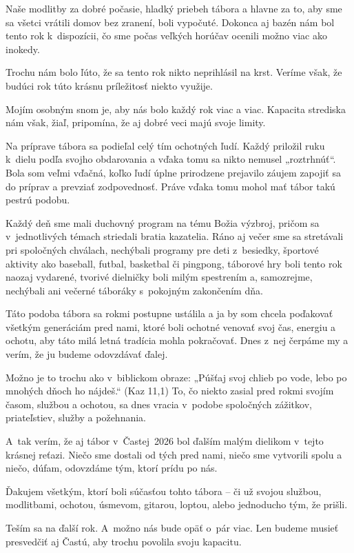 Naše modlitby za dobré počasie, hladký priebeh tábora a hlavne za to, aby sme sa všetci vrátili domov bez zranení, boli vypočuté. Dokonca aj bazén nám bol tento rok k~dispozícii, čo sme počas veľkých horúčav ocenili možno viac ako inokedy.

Trochu nám bolo ľúto, že sa tento rok nikto neprihlásil na krst. Veríme však, že budúci rok túto krásnu príležitosť niekto využije.

Mojím osobným snom je, aby nás bolo každý rok viac a viac. Kapacita strediska nám však, žiaľ, pripomína, že aj dobré veci majú svoje limity.

Na príprave tábora sa podieľal celý tím ochotných ľudí. Každý priložil ruku
k~dielu podľa svojho obdarovania a vďaka tomu sa nikto nemusel „roztrhnúť“. Bola som veľmi vďačná, koľko ľudí úplne prirodzene prejavilo záujem zapojiť sa do príprav a prevziať zodpovednosť. Práve vďaka tomu mohol mať tábor takú pestrú podobu.

Každý deň sme mali duchovný program na tému Božia výzbroj, pričom sa
v~jednotlivých témach striedali bratia kazatelia. Ráno aj večer sme sa stretávali pri spoločných chválach, nechýbali programy pre deti z~besiedky, športové aktivity ako baseball, futbal, basketbal či pingpong, táborové hry boli tento rok naozaj vydarené, tvorivé dielničky boli milým spestrením a, samozrejme, nechýbali ani večerné táboráky s~pokojným zakončením dňa.

Táto podoba tábora sa rokmi postupne ustálila a ja by som chcela poďakovať všetkým generáciám pred nami, ktoré boli ochotné venovať svoj čas, energiu a ochotu, aby táto milá letná tradícia mohla pokračovať. Dnes z~nej čerpáme my a verím, že ju budeme odovzdávať ďalej.

Možno je to trochu ako v~biblickom obraze: „Púšťaj svoj chlieb po vode, lebo po mnohých dňoch ho nájdeš.“ (Kaz 11,1) To, čo niekto zasial pred rokmi svojím časom, službou a ochotou, sa dnes vracia v~podobe spoločných zážitkov, priateľstiev, služby a požehnania.

A~tak verím, že aj tábor v~Častej~2026 bol ďalším malým dielikom v~tejto krásnej reťazi. Niečo sme dostali od tých pred nami, niečo sme vytvorili spolu a niečo, dúfam, odovzdáme tým, ktorí prídu po nás.

Ďakujem všetkým, ktorí boli súčasťou tohto tábora -- či už svojou službou, modlitbami, ochotou, úsmevom, gitarou, loptou, alebo jednoducho tým, že prišli.

Teším sa na ďalší rok. A~možno nás bude opäť o~pár viac. Len budeme musieť presvedčiť aj Častú, aby trochu povolila svoju kapacitu. \smiley


